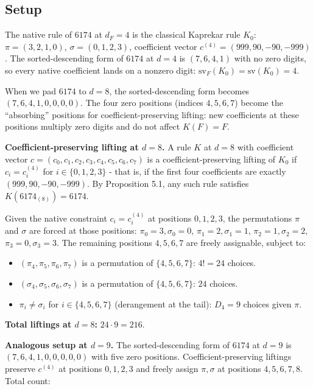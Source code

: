 \documentclass[11pt,letterpaper]{article}
\providecommand{\tightlist}{%
  \setlength{\itemsep}{0pt}\setlength{\parskip}{0pt}}
\theoremstyle{paperstyle}
\theoremstyle{paperstyledef}
\theoremstyle{paperstylerem}
\begin{document}
\hypertarget{e.1-setup}{%
\subsection{Setup}\label{e.1-setup}}

The native rule of \(6174\) at \(d_F = 4\) is the classical Kaprekar
rule \(K_0\): \(\pi = (3, 2, 1, 0)\), \(\sigma = (0, 1, 2, 3)\),
coefficient vector \(c^{(4)} = (999, 90, -90, -999)\). The
sorted-descending form of \(6174\) at \(d = 4\) is \((7, 6, 4, 1)\) with
no zero digits, so every native coefficient lands on a nonzero digit:
\(\mathrm{sv}_F(K_0) = \mathrm{sv}(K_0) = 4\).

When we pad \(6174\) to \(d = 8\), the sorted-descending form becomes
\((7, 6, 4, 1, 0, 0, 0, 0)\). The four zero positions (indices
\(4, 5, 6, 7\)) become the ``absorbing'' positions for
coefficient-preserving lifting: new coefficients at these positions
multiply zero digits and do not affect \(K(F) = F\).

\textbf{Coefficient-preserving lifting at \(d = 8\).} A rule \(K\) at
\(d = 8\) with coefficient vector
\(c = (c_0, c_1, c_2, c_3, c_4, c_5, c_6, c_7)\) is a
coefficient-preserving lifting of \(K_0\) if \(c_i = c_i^{(4)}\) for
\(i \in \{0, 1, 2, 3\}\) - that is, if the first four coefficients are
exactly \((999, 90, -90, -999)\). By Proposition 5.1, any such rule
satisfies \(K(6174_{(8)}) = 6174\).

Given the native constraint \(c_i = c_i^{(4)}\) at positions
\(0, 1, 2, 3\), the permutations \(\pi\) and \(\sigma\) are forced at
those positions: \(\pi_0 = 3, \sigma_0 = 0\),
\(\pi_1 = 2, \sigma_1 = 1\), \(\pi_2 = 1, \sigma_2 = 2\),
\(\pi_3 = 0, \sigma_3 = 3\). The remaining positions \(4, 5, 6, 7\) are
freely assignable, subject to:

\begin{itemize}
\tightlist
\item
  \((\pi_4, \pi_5, \pi_6, \pi_7)\) is a permutation of
  \(\{4, 5, 6, 7\}\): \(4! = 24\) choices.
\item
  \((\sigma_4, \sigma_5, \sigma_6, \sigma_7)\) is a permutation of
  \(\{4, 5, 6, 7\}\): \(24\) choices.
\item
  \(\pi_i \neq \sigma_i\) for \(i \in \{4, 5, 6, 7\}\) (derangement at
  the tail): \(D_4 = 9\) choices given \(\pi\).
\end{itemize}

\textbf{Total liftings at \(d = 8\):} \(24 \cdot 9 = 216\).

\textbf{Analogous setup at \(d = 9\).} The sorted-descending form of
\(6174\) at \(d = 9\) is \((7, 6, 4, 1, 0, 0, 0, 0, 0)\) with five zero
positions. Coefficient-preserving liftings preserve \(c^{(4)}\) at
positions \(0, 1, 2, 3\) and freely assign \(\pi, \sigma\) at positions
\(4, 5, 6, 7, 8\). Total count:
\end{document}

